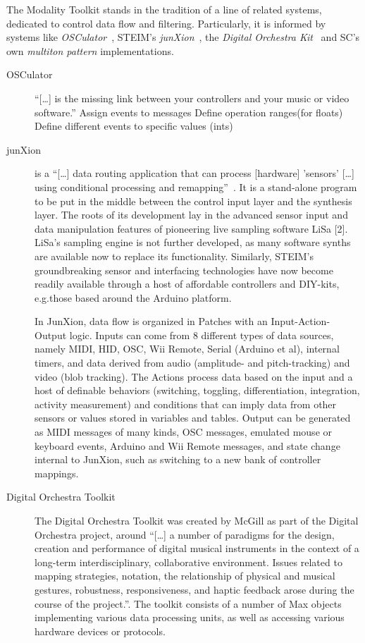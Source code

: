 \documentclass{article}
\begin{document}
The Modality Toolkit stands in the tradition of a line of related systems, dedicated to control data flow and filtering.
Particularly, it is informed by systems like \emph{OSCulator}~\cite{troillard2012-osc}, STEIM's \emph{junXion}~\cite{-jun}, the \emph{Digital Orchestra Kit}~\cite{malloch2008-a-n} and SC's own \emph{multiton pattern} implementations.

\begin{description}
	\item[OSCulator] 
		\enquote{[\dots] is the missing link between your controllers and your music or video software.}
		Assign events to messages
		Define operation ranges(for floats)
		Define different events to specific values (ints) 
	\item[junXion] 
		is a \enquote{[\dots] data routing application that can process [hardware] 'sensors' [\dots] using conditional processing and remapping}~\cite{-jun}. 
		It is a stand-alone program to be put in the middle between the control input layer and the synthesis layer.
The roots of its development lay in the advanced sensor input and data manipulation features of pioneering live sampling software LiSa [2]. 
LiSa's sampling engine is not further developed, as many software synths are available now to replace its functionality. 
Similarly, STEIM's groundbreaking sensor and interfacing technologies have now become readily available through a host of affordable controllers and DIY-kits, e.g.those based around the Arduino platform.

In JunXion, data flow is organized in Patches with an Input-Action-Output logic. 
Inputs can come from 8 different types of data sources, namely MIDI, HID, OSC, Wii Remote, Serial (Arduino et al), internal timers, and data derived from audio (amplitude- and pitch-tracking) and video (blob tracking). 
The Actions process data based on the input and a host of definable behaviors (switching, toggling, differentiation, integration, activity measurement) and conditions that can imply data from other sensors or values stored in variables and tables. 
Output can be generated as MIDI messages of many kinds, OSC messages, emulated mouse or keyboard events, Arduino and Wii Remote messages, and state change internal to JunXion, such as switching to a new bank of controller mappings. 

  \item[Digital Orchestra Toolkit] The Digital Orchestra Toolkit \cite{-dot} was created by McGill as part of the Digital Orchestra project, around \enquote{[\dots] a number of paradigms for the design, creation and performance of digital musical instruments in the context of a long-term interdisciplinary, collaborative environment. Issues related to mapping strategies, notation, the relationship of physical and musical gestures, robustness, responsiveness, and haptic feedback arose during the course of the project.}\cite{ferguson-2009}. The toolkit consists of a number of Max objects implementing various data processing units, as well as accessing various hardware devices or protocols.
	

\end{description}
\end{document}
